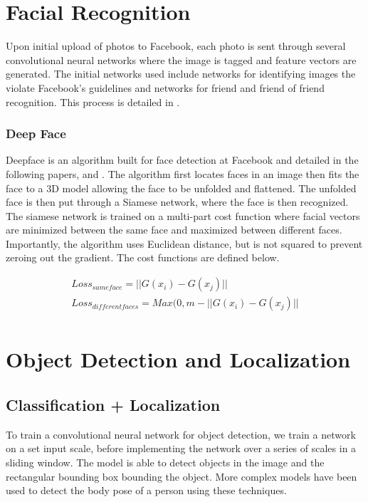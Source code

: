 \section{Facial Recognition}\label{section:facialRecognition}
Upon initial upload of photos to Facebook, each photo is sent through several convolutional neural networks where the image is tagged and feature vectors are generated.  
The initial networks used include networks for identifying images the violate Facebook's guidelines and networks for friend and friend of friend recognition.  
This process is detailed in \cite{DBLP:journals/corr/abs-1805-00932}.

\subsubsection{Deep Face}\label{subsection:f_deepface}
Deepface is an algorithm built for face detection at Facebook and detailed in the following papers, \cite{Chopra:2005:LSM:1068507.1068961} and \cite{hadsell-chopra-lecun-06}.  
The algorithm first locates faces in an image then fits the face to a 3D model allowing the face to be unfolded and flattened.  
The unfolded face is then put through a Siamese network, where the face is then recognized.  
The siamese network is trained on a multi-part cost function where facial vectors are minimized between the same face and maximized between different faces.  
Importantly, the algorithm uses Euclidean distance, but is not squared to prevent zeroing out the gradient.  
The cost functions are defined below.


\begin{align*}
    Loss_{same face} = ||G  (x_i)  - G(x_j)|| \\
    Loss_{different faces} = Max(0, m- || G(x_i)  - G(x_j)|| \\
\end{align*}

\section{Object Detection and Localization}\label{section:objectDetection}
\subsection{Classification + Localization}\label{subsection:od_classification}
To train a convolutional neural network for object detection, we train a network on a set input scale, before implementing the network over a series of scales in a sliding window.  
The model is able to detect objects in the image and the rectangular bounding box bounding the object.  
More complex models have been used to detect the body pose of a person using these techniques.

